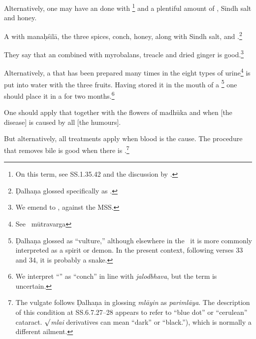 \begin{translation}
    
    
    Alternatively, one may have an  done with
    \footnote{On this term, see SS.1.35.42 
    \citep[157]{vulgate} and the discussion by
    \citet[25--31]{zimm-1999}.} 
    and a plentiful amount of , Sindh salt and honey.
    
    \item[40] %
    
    A  with 
    \gls{manaḥśilā}, the three spices, conch, honey, along with Sindh salt, 
     and .\footnote{Ḍalhaṇa 
    glossed   specifically as  
    \citep[629]{vulgate}.}
    
    They say that an 
     combined with 
    myrobalans, 
    treacle and 
    dried ginger
    is good.\footnote{We emend  to , against the MSS.}
    
    \item[41]
    
    Alternatively, a  that has been prepared many times in 
    the eight types of
    urine\footnote{See \SS\ mūtravarga} is put into water with the 
    three 
    fruits. Having
    stored it in the mouth of a \footnote{Ḍalhaṇa
    glossed  as “vulture,” although elsewhere in the
    \SS\ it is more commonly interpreted as a spirit or demon.  In the present context, 
    following verses 33 and 34, it is probably a snake.} one should place it in a
     for two months.\footnote{We interpret
    “” as “conch” in line with \emph{jalodbhava}, but the
    term is uncertain.}
    
    
    \item[42]
    
    One should apply that  
    together with the flowers of
    \gls{madhūka}
    and
    when [the disease] is caused by all [the humours].
    
    But alternatively, all treatments apply when blood is the cause.  The procedure
    that removes bile is good when there is .\footnote{The vulgate follows Ḍalhaṇa in glossing \emph{mlāyin} as
    \emph{parimlāya}.  The description of this condition at SS.6.7.27--28 appears to
    refer to “blue dot” or “cerulean” cataract.  \emph{$\surd$mlai} derivatives can 
    mean “dark” or “black.”), which is normally a different ailment.}
    

\end{translation}
